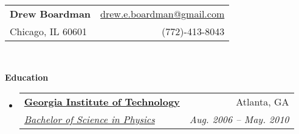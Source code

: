 \documentclass[letterpaper,11pt]{article}
\makeatletter
\newcommand{\resheading}[1]{{\large \colorbox{mygrey}{\begin{minipage}{\textwidth}{\textbf{#1 \vphantom{p\^{E}}}}\end{minipage}}}}
\newcommand{\ressubheading}[4]{
\begin{tabular*}{6.5in}{l@{\extracolsep{\fill}}r}
		\textbf{#1} & #2 \\
		\textit{#3} & \textit{#4} \\
\end{tabular*}\vspace{-6pt}}
\makeatother
\begin{document}
\newcommand{\mywebheader}{
\begin{tabular*}{7in}{l@{\extracolsep{\fill}}r}
	\textbf{{\LARGE Drew Boardman}} & \href{mailto:drew.e.boardman@gmail.com}{drew.e.boardman@gmail.com}\\
	{\footnotesize {Chicago, IL 60601}} & {(772)-413-8043} \\
	\end{tabular*}
\\
\vspace{0.1in}}

\mywebheader


\resheading{Education}
\begin{itemize}
\item
\ressubheading{\href{http://www.gatech.edu}{Georgia Institute of Technology}}{Atlanta, GA}{\href{http://www.catalog.gatech.edu/colleges/cos/physics/ugrad/phy/geninfo.php}{Bachelor of Science in Physics}}{Aug. 2006 -- May. 2010}
\end{itemize} %
\end{document}

